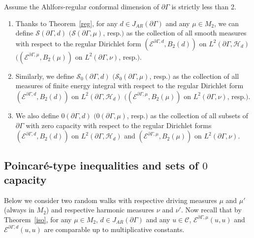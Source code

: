 \documentclass[AHL,Unicode,longabstracts,published]{cedram}
\newcommand{\ce}{\mathcal{E}}
\newcommand{\cs}{\mathcal{S}}
\newcommand{\ch}{\mathcal{H}}
\newcommand{\cC}{\mathcal{C}}
\begin{document}
\begin{defi}\label{SS}
Assume the Ahlfors-regular conformal dimension of $\partial\Gamma$ is strictly less than 2.
\begin{enumerate}
\item\label{defi6.9.1} Thanks to Theorem~\ref{reg}, for any $d\in J_{AR}(\partial\Gamma)$ and any $\mu\in M_2$, we can define $\cs(\partial \Gamma,d)$ $(\cs(\partial \Gamma,\mu)$, resp.$)$ as the collection of all smooth measures with respect to the regular Dirichlet form $(\ce^{\partial\Gamma,d},B_2(d))$ on $L^2(\partial\Gamma,\ch_{d})$ $((\ce^{\partial\Gamma,\mu},B_2(\mu))$ on $L^2(\partial\Gamma,\nu)$, resp.$)$.
\item\label{defi6.9.2} Similarly, we define $\cs_0(\partial \Gamma,d)$ $(\cs_0(\partial \Gamma,\mu)$, resp.$)$ as the collection of all measures of finite energy integral with respect to the regular Dirichlet form $(\ce^{\partial\Gamma,d},B_2(d))$ on $L^2(\partial\Gamma,\ch_{d})$ $((\ce^{\partial\Gamma,\mu},B_2(\mu))$ on $L^2(\partial\Gamma,\nu)$, resp.$)$.
\item\label{defi6.9.3} We also define $0(\partial \Gamma,d)$ $(0(\partial \Gamma,\mu)$, resp.$)$ as the collection of all subsets of $\partial\Gamma$ with zero capacity with respect to the regular Dirichlet forms $(\ce^{\partial\Gamma,d},B_2(d))$ on $L^2(\partial\Gamma,\ch_{d})$ and \newline
$(\ce^{\partial\Gamma,\mu},B_2(\mu))$ on $L^2(\partial\Gamma,\nu)$.
\end{enumerate}
\end{defi}

\subsection{Poincaré-type inequalities and sets of \texorpdfstring{$0$}{0} capacity}

Below we consider two random walks with respective driving measures $\mu$ and $\mu'$ (always in $M_2$) and respective harmonic measures $\nu$ and $\nu'$. Now recall that by Theorem~\ref{iso}, for any $\mu\in M_2$, $d\in J_{AR}(\partial\Gamma)$ and any $u\in\cC$, $\ce^{\partial\Gamma,\mu}(u,u)$ and $\ce^{\partial\Gamma,d}(u,u)$ are comparable up to multiplicative constants.
\end{document}
